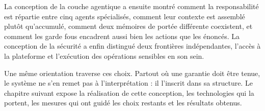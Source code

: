 La conception de la couche agentique a ensuite montré comment la responsabilité est répartie entre cinq agents spécialisés, comment leur contexte est assemblé plutôt qu'accumulé, comment deux mémoires de portée différente coexistent, et comment les garde fous encadrent aussi bien les actions que les énoncés. La conception de la sécurité a enfin distingué deux frontières indépendantes, l'accès à la plateforme et l'exécution des opérations sensibles en son sein.

Une même orientation traverse ces choix. Partout où une garantie doit être tenue, le système ne s'en remet pas à l'interprétation : il l'inscrit dans sa structure. Le chapitre suivant expose la réalisation de cette conception, les technologies qui la portent, les mesures qui ont guidé les choix restants et les résultats obtenus.
